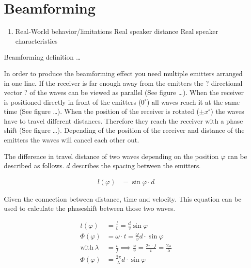 \section{Beamforming}

\begin{enumerate}
  \item Real-World behavior/limitations
  \subitem Real speaker distance
  \subitem Real speaker characteristics
\end{enumerate}

Beamforming definition \dots

In order to produce the beamforming effect you need multiple emitters arranged in one line.
If the receiver is far enough away from the emitters the ? directional vector ? of the waves can be viewed as parallel (See figure \dots). When the receiver is positioned directly in front of the emitters (\(0^\circ\)) all waves reach it at the same time (See figure \dots).
When the position of the receiver is rotated (\(\pm x^\circ\)) the waves have to travel different distances. Therefore they reach the receiver with a phase shift (See figure \dots). Depending of the position of the receiver and distance of the emitters the waves will cancel each other out.

The difference in travel distance of two waves depending on the position \(\varphi\) can be described as follows. \(d\) describes the spacing between the emitters.

\begin{align}
  l(\varphi) &= \sin \varphi \cdot d
\end{align}

Given the connection between distance, time and velocity. This equation can be used to calculate the phaseshift between those two waves.

\begin{align}
  t(\varphi)     &= \frac{l}{v} = \frac{d}{v} \sin \varphi \\[1em]
  \Phi(\varphi)  &= \omega \cdot t = \frac{\omega}{v} d \cdot \sin \varphi \\[1em]
  \mathrm{with~} \lambda &= \frac{v}{f} \implies \frac{\omega}{v} = \frac{2\pi \cdot f}{v} = \frac{2\pi}{\lambda} \\[1em]
  \Phi(\varphi)  &= \frac{2\pi}{\lambda} d \cdot \sin \varphi
\end{align}

